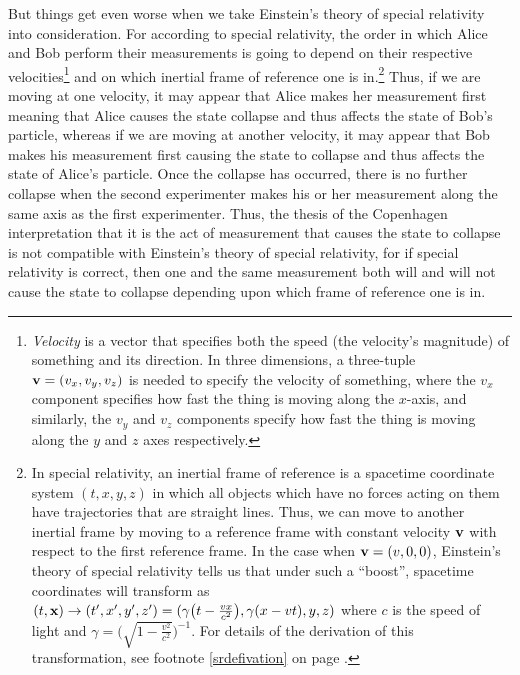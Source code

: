 But things get even worse when we take Einstein's theory of special relativity into consideration. For according to special relativity, the order in which Alice and Bob perform their measurements is going to depend on their respective velocities\footnote{\label{Velocityfootnote}\emph{Velocity} is a vector that specifies both the speed (the velocity's magnitude) of something and its direction. In three dimensions, a three-tuple $\vb{v}=(v_x, v_y, v_z)$  %
%
is needed to specify the velocity of something, where the $v_x$ component specifies how fast the thing is moving along the $x$-axis, and similarly, the $v_y$ and $v_z$ components specify how fast the thing is moving along the $y$ and $z$ axes respectively.} and on which inertial frame of reference one is in.\footnote{\label{inertialfootnote}In special relativity, an inertial frame of reference is a spacetime coordinate system $(t, x, y, z)$   %
%
in which all objects which have no forces acting on them have trajectories that are straight lines. Thus, we can move to another inertial frame by moving to a reference frame with constant velocity $\vb{v}$ with respect to the first reference frame. In the case when $\vb{v}=(v, 0, 0)$, Einstein's theory of special relativity tells us that under such a “boost”, spacetime coordinates will transform as $(t,\vb{x})\rightarrow(t',x',y',z')=(\gamma\big(t - \frac{vx}{c^2}\big),\gamma(x-vt),y,z)$  %
%
where $c$  %
%
is the speed of light and $\gamma=\Big(\sqrt{1-\frac{v^2}{c^2}}\Big)^{-1}.$ For details of the derivation of this transformation, see footnote \ref{srdefivation} on page \pageref{srdefivation}.} Thus, if we are moving at one velocity, it may appear that Alice makes her measurement first meaning that Alice causes the state collapse and thus affects the state of Bob's particle, whereas if we are moving at another velocity, it may appear that Bob makes his measurement first causing the state to collapse and thus affects the state of Alice's particle. Once the collapse has occurred, there is no further collapse when the second experimenter makes his or her measurement along the same axis as the first experimenter. Thus, the thesis of the Copenhagen interpretation that it is the act of measurement that causes the state to collapse is not compatible with Einstein's theory of special relativity, for if special relativity is correct, then one and the same measurement both will and will not cause the state to collapse depending upon which frame of reference one is in.

